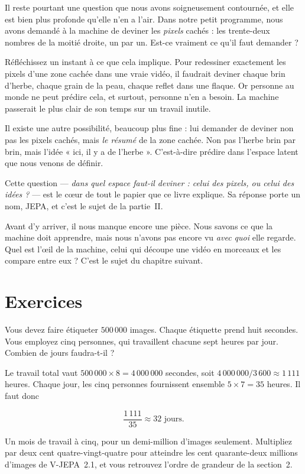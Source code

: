 Il reste pourtant une question que nous avons soigneusement contournée, et
elle est bien plus profonde qu'elle n'en a l'air. Dans notre petit programme,
nous avons demandé à la machine de deviner les \emph{pixels} cachés : les
trente-deux nombres de la moitié droite, un par un. Est-ce vraiment ce qu'il
faut demander ?

Réfléchissez un instant à ce que cela implique. Pour redessiner exactement
les pixels d'une zone cachée dans une vraie vidéo, il faudrait deviner chaque
brin d'herbe, chaque grain de la peau, chaque reflet dans une flaque. Or
personne au monde ne peut prédire cela, et surtout, personne n'en a besoin.
La machine passerait le plus clair de son temps sur un travail inutile.

Il existe une autre possibilité, beaucoup plus fine : lui demander de deviner
non pas les pixels cachés, mais \emph{le résumé} de la zone cachée. Non pas
l'herbe brin par brin, mais l'idée « ici, il y a de l'herbe ». C'est-à-dire
prédire dans l'espace latent que nous venons de définir.

Cette question — \emph{dans quel espace faut-il deviner : celui des pixels,
ou celui des idées ?} — est le cœur de tout le papier que ce livre
explique. Sa réponse porte un nom, JEPA, et c'est le sujet de la partie~II.

Avant d'y arriver, il nous manque encore une pièce. Nous savons ce que la
machine doit apprendre, mais nous n'avons pas encore vu \emph{avec quoi} elle
regarde. Quel est l'œil de la machine, celui qui découpe une vidéo en
morceaux et les compare entre eux ? C'est le sujet du chapitre suivant.

\section*{Exercices}

\begin{exercice}
Vous devez faire étiqueter $500\,000$ images. Chaque étiquette prend huit
secondes. Vous employez cinq personnes, qui travaillent chacune sept heures
par jour. Combien de jours faudra-t-il ?
\end{exercice}

\begin{solution}
Le travail total vaut $500\,000 \times 8 = 4\,000\,000$ secondes, soit
$4\,000\,000 / 3\,600 \approx 1\,111$ heures. Chaque jour, les cinq personnes
fournissent ensemble $5 \times 7 = 35$ heures. Il faut donc

\[
  \frac{1\,111}{35} \approx 32 \text{ jours.}
\]

Un mois de travail à cinq, pour un demi-million d'images seulement. Multipliez
par deux cent quatre-vingt-quatre pour atteindre les cent quarante-deux
millions d'images de V-JEPA~2.1, et vous retrouvez l'ordre de grandeur de la
section~2.
\end{solution}

